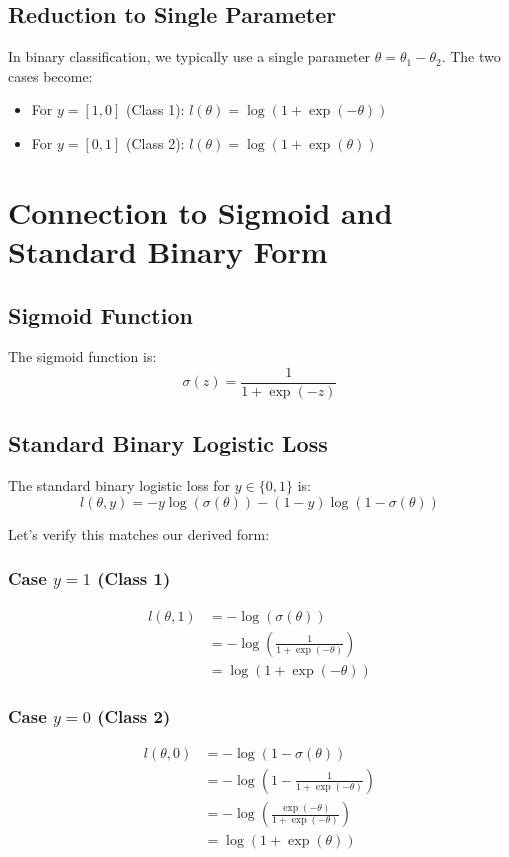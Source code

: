 \begin{notechapter}
\subsection{Reduction to Single Parameter}
In binary classification, we typically use a single parameter $\theta = \theta_1 - \theta_2$. The two cases become:

\begin{itemize}
    \item For $y = [1, 0]$ (Class 1): $l(\theta) = \log(1 + \exp(-\theta))$
    \item For $y = [0, 1]$ (Class 2): $l(\theta) = \log(1 + \exp(\theta))$
\end{itemize}

\section{Connection to Sigmoid and Standard Binary Form}

\subsection{Sigmoid Function}
The sigmoid function is:
\[
\sigma(z) = \frac{1}{1 + \exp(-z)}
\]

\subsection{Standard Binary Logistic Loss}
The standard binary logistic loss for $y \in \{0,1\}$ is:
\[
l(\theta, y) = -y\log(\sigma(\theta)) - (1-y)\log(1-\sigma(\theta))
\]

Let's verify this matches our derived form:

\subsubsection{Case $y=1$ (Class 1)}
\begin{align*}
l(\theta, 1) &= -\log(\sigma(\theta)) \\
&= -\log\left(\frac{1}{1 + \exp(-\theta)}\right) \\
&= \log(1 + \exp(-\theta))
\end{align*}

\subsubsection{Case $y=0$ (Class 2)}
\begin{align*}
l(\theta, 0) &= -\log(1-\sigma(\theta)) \\
&= -\log\left(1 - \frac{1}{1 + \exp(-\theta)}\right) \\
&= -\log\left(\frac{\exp(-\theta)}{1 + \exp(-\theta)}\right) \\
&= \log(1 + \exp(\theta))
\end{align*}


\end{notechapter}
